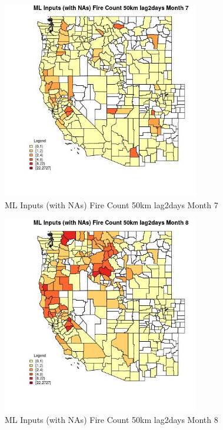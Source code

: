 \begin{figure} 
\centering  
\includegraphics[width=0.77\textwidth]{Code_Outputs/Report_ML_input_PM25_Step4_part_f_de_duplicated_aves_prioritize_24hr_obswNAs_CountyFire_Count_50km_lag2daysmedianMonth7.jpg} 
\caption{\label{fig:Report_ML_input_PM25_Step4_part_f_de_duplicated_aves_prioritize_24hr_obswNAsCountyFire_Count_50km_lag2daysmedianMonth7}ML Inputs (with NAs) Fire Count 50km lag2days Month 7} 
\end{figure} 
 

\begin{figure} 
\centering  
\includegraphics[width=0.77\textwidth]{Code_Outputs/Report_ML_input_PM25_Step4_part_f_de_duplicated_aves_prioritize_24hr_obswNAs_CountyFire_Count_50km_lag2daysmedianMonth8.jpg} 
\caption{\label{fig:Report_ML_input_PM25_Step4_part_f_de_duplicated_aves_prioritize_24hr_obswNAsCountyFire_Count_50km_lag2daysmedianMonth8}ML Inputs (with NAs) Fire Count 50km lag2days Month 8} 
\end{figure} 
 

